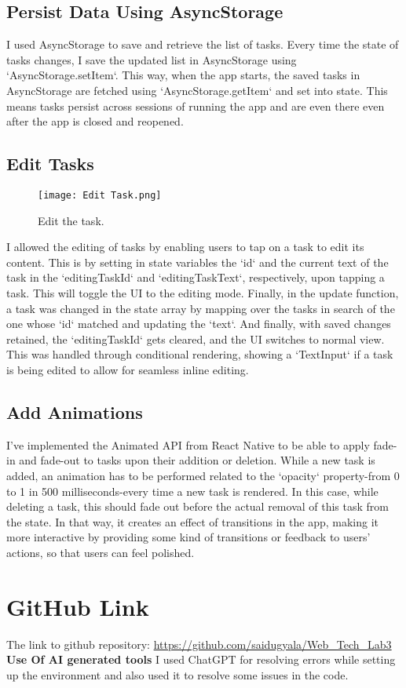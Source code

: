\documentclass[a4paper,12pt]{article}
\begin{document}
\subsection{Persist Data Using AsyncStorage}
I used AsyncStorage to save and retrieve the list of tasks. Every time the state of tasks changes, I save the updated list in AsyncStorage using `AsyncStorage.setItem`. This way, when the app starts, the saved tasks in AsyncStorage are fetched using `AsyncStorage.getItem` and set into state. This means tasks persist across sessions of running the app and are even there even after the app is closed and reopened.

\subsection{Edit Tasks}
\begin{figure}[H]
    \centering
    \texttt{[image: Edit Task.png]}
    \caption{Edit the task.}
    \label{fig:emulator}
\end{figure}
I allowed the editing of tasks by enabling users to tap on a task to edit its content. This is by setting in state variables the `id` and the current text of the task in the `editingTaskId` and `editingTaskText`, respectively, upon tapping a task. This will toggle the UI to the editing mode. Finally, in the update function, a task was changed in the state array by mapping over the tasks in search of the one whose `id` matched and updating the `text`. And finally, with saved changes retained, the `editingTaskId` gets cleared, and the UI switches to normal view. This was handled through conditional rendering, showing a `TextInput`  if a task is being edited to allow for seamless inline editing.

\subsection{Add Animations}
I've implemented the Animated API from React Native to be able to apply fade-in and fade-out to tasks upon their addition or deletion. While a new task is added, an animation has to be performed related to the `opacity` property-from 0 to 1 in 500 milliseconds-every time a new task is rendered. In this case, while deleting a task, this should fade out  before the actual removal of this task from the state. In that way, it creates an effect of transitions in the app, making it more interactive by providing some kind of transitions or feedback to users' actions, so that users can feel polished.

\section{GitHub Link}
The link to github repository:
\url{https://github.com/saidugyala/Web_Tech_Lab3}
\\

\textbf{Use Of AI generated tools}
I used ChatGPT for resolving errors while setting up the environment and also used it to resolve some issues in the code. 
\end{document}
